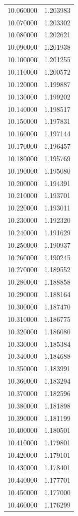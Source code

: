 \begin{tabular}{rr}
10.060000 & 1.203983 \\
10.070000 & 1.203302 \\
10.080000 & 1.202621 \\
10.090000 & 1.201938 \\
10.100000 & 1.201255 \\
10.110000 & 1.200572 \\
10.120000 & 1.199887 \\
10.130000 & 1.199202 \\
10.140000 & 1.198517 \\
10.150000 & 1.197831 \\
10.160000 & 1.197144 \\
10.170000 & 1.196457 \\
10.180000 & 1.195769 \\
10.190000 & 1.195080 \\
10.200000 & 1.194391 \\
10.210000 & 1.193701 \\
10.220000 & 1.193011 \\
10.230000 & 1.192320 \\
10.240000 & 1.191629 \\
10.250000 & 1.190937 \\
10.260000 & 1.190245 \\
10.270000 & 1.189552 \\
10.280000 & 1.188858 \\
10.290000 & 1.188164 \\
10.300000 & 1.187470 \\
10.310000 & 1.186775 \\
10.320000 & 1.186080 \\
10.330000 & 1.185384 \\
10.340000 & 1.184688 \\
10.350000 & 1.183991 \\
10.360000 & 1.183294 \\
10.370000 & 1.182596 \\
10.380000 & 1.181898 \\
10.390000 & 1.181199 \\
10.400000 & 1.180501 \\
10.410000 & 1.179801 \\
10.420000 & 1.179101 \\
10.430000 & 1.178401 \\
10.440000 & 1.177701 \\
10.450000 & 1.177000 \\
10.460000 & 1.176299 \\

\end{tabular}
